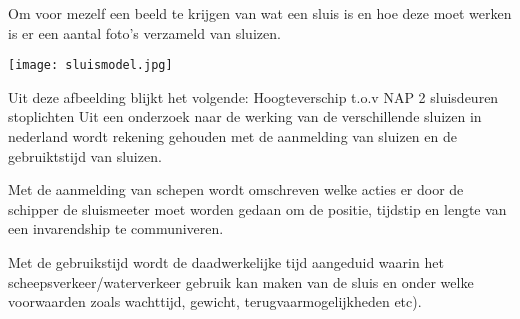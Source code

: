  
\label{appendix}
\thispagestyle{myheadings}

 
Om voor mezelf een beeld te krijgen van wat een sluis is en hoe deze moet werken is er een aantal foto's verzameld van sluizen.	

\texttt{[image: sluismodel.jpg]}


Uit deze afbeelding blijkt het volgende:
Hoogteverschip t.o.v NAP
2 sluisdeuren
stoplichten
Uit een onderzoek naar de werking van de verschillende sluizen in nederland wordt rekening gehouden met de aanmelding van sluizen en de gebruiktstijd van sluizen.

Met de aanmelding van schepen wordt omschreven welke acties er door de schipper de sluismeeter moet worden gedaan om de positie, tijdstip en lengte van een invarendship te communiveren.

Met de gebruikstijd wordt  de daadwerkelijke tijd aangeduid waarin het scheepsverkeer/waterverkeer gebruik kan maken van de sluis en onder welke voorwaarden zoals wachttijd, gewicht, terugvaarmogelijkheden etc).

